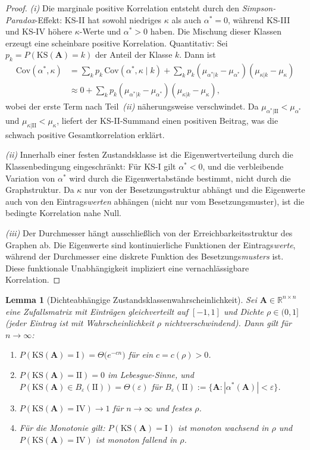 ﻿\documentclass[12pt, a4paper, titlepage]{report}
\newtheorem{lemma}[theorem]{Lemma}
\theoremstyle{definition}
\theoremstyle{remark}
\newcommand{\R}{\mathbb{R}}
\newcommand{\vA}{\bm{A}}
\newcommand{\KS}{\mathrm{KS}}
\begin{document}
\begin{proof}
\textit{(i)} Die marginale positive Korrelation entsteht durch den
\emph{Simpson-Paradox}-Effekt: KS-II hat sowohl niedriges $\kappa$ als auch
$\alpha^* = 0$, während KS-III und KS-IV höhere $\kappa$-Werte und $\alpha^* > 0$
haben. Die Mischung dieser Klassen erzeugt eine scheinbare positive Korrelation.
Quantitativ: Sei $p_k = P(\KS(\vA) = k)$ der Anteil der Klasse $k$. Dann ist
\begin{align*}
  \mathrm{Cov}(\alpha^*, \kappa)
  &= \sum_k p_k \,\mathrm{Cov}(\alpha^*, \kappa \mid k)
    + \sum_k p_k (\mu_{\alpha^*|k} - \mu_{\alpha^*})(\mu_{\kappa|k} - \mu_\kappa) \\
  &\approx 0 + \sum_k p_k (\mu_{\alpha^*|k} - \mu_{\alpha^*})(\mu_{\kappa|k} - \mu_\kappa),
\end{align*}
wobei der erste Term nach Teil~\textit{(ii)} näherungsweise verschwindet.
Da $\mu_{\alpha^*|\mathrm{II}} < \mu_{\alpha^*}$ und $\mu_{\kappa|\mathrm{II}} <
\mu_\kappa$, liefert der KS-II-Summand einen positiven Beitrag, was die
schwach positive Gesamtkorrelation erklärt.

\textit{(ii)} Innerhalb einer festen Zustandsklasse ist die Eigenwertverteilung
durch die Klassenbedingung eingeschränkt: Für KS-I gilt $\alpha^* < 0$, und die
verbleibende Variation von $\alpha^*$ wird durch die Eigenwertabstände bestimmt,
nicht durch die Graphstruktur. Da $\kappa$ nur von der Besetzungsstruktur abhängt
und die Eigenwerte auch von den Eintrags\emph{werten} abhängen (nicht nur vom
Besetzungsmuster), ist die bedingte Korrelation nahe Null.

\textit{(iii)} Der Durchmesser hängt ausschließlich von der Erreichbarkeitsstruktur
des Graphen ab. Die Eigenwerte sind kontinuierliche Funktionen der Eintrags\emph{werte},
während der Durchmesser eine diskrete Funktion des Besetzungs\emph{musters} ist. Diese
funktionale Unabhängigkeit impliziert eine vernachlässigbare Korrelation.
\end{proof}

\begin{lemma}[Dichteabhängige Zustandsklassenwahrscheinlichkeit]
\label{lem:dichte_ks}
Sei $\vA \in \R^{n \times n}$ eine Zufallsmatrix mit Einträgen gleichverteilt auf
$[-1,1]$ und Dichte $\rho \in (0,1]$ (jeder Eintrag ist mit Wahrscheinlichkeit $\rho$
nichtverschwindend). Dann gilt für $n \to \infty$:
\begin{enumerate}[label=(\roman*)]
  \item $P(\KS(\vA) = \mathrm{I}) = \Theta\bigl(e^{-cn}\bigr)$ für ein $c = c(\rho) > 0$.
  \item $P(\KS(\vA) = \mathrm{II}) = 0$ im Lebesgue-Sinne, und
    $P(\KS(\vA) \in B_\varepsilon(\mathrm{II})) = \Theta(\varepsilon)$ für
    $B_\varepsilon(\mathrm{II}) := \{\vA : |\alpha^*(\vA)| < \varepsilon\}$.
  \item $P(\KS(\vA) = \mathrm{IV}) \to 1$ für $n \to \infty$ und festes $\rho$.
  \item Für die Monotonie gilt: $P(\KS(\vA) = \mathrm{I})$ ist monoton wachsend in
    $\rho$ und $P(\KS(\vA) = \mathrm{IV})$ ist monoton fallend in $\rho$.
\end{enumerate}
\end{lemma}
\end{document}
